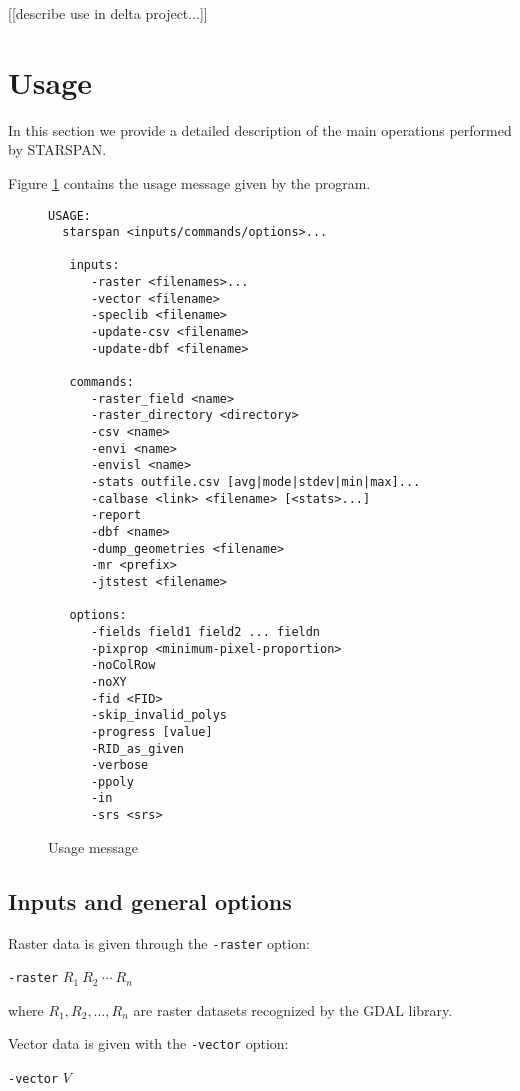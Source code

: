 \documentclass{elsart}
\begin{document}
	[[describe use in delta project...]]

\section{Usage}

In this section we provide a detailed description of the
main operations performed by STARSPAN.

Figure \ref{fig-usage} contains the usage message given by
the program.

\begin{figure}[!ht]
\centering
\scriptsize{
\begin{verbatim}
USAGE:
  starspan <inputs/commands/options>...

   inputs:
      -raster <filenames>...
      -vector <filename>
      -speclib <filename>
      -update-csv <filename>
      -update-dbf <filename>

   commands:
      -raster_field <name>
      -raster_directory <directory>
      -csv <name>
      -envi <name>
      -envisl <name>
      -stats outfile.csv [avg|mode|stdev|min|max]...
      -calbase <link> <filename> [<stats>...]
      -report
      -dbf <name>
      -dump_geometries <filename>
      -mr <prefix>
      -jtstest <filename>

   options:
      -fields field1 field2 ... fieldn
      -pixprop <minimum-pixel-proportion>
      -noColRow
      -noXY
      -fid <FID>
      -skip_invalid_polys
      -progress [value]
      -RID_as_given
      -verbose
      -ppoly
      -in
      -srs <srs>
\end{verbatim}
}
\label{fig-usage}
\caption{Usage message}
\end{figure}

\subsection{Inputs and general options}

Raster data is given through the \verb|-raster| option:

	\verb|-raster| $R_1\ R_2\ \cdots\ R_n$

where $R_1, R_2, \ldots, R_n$ are raster datasets recognized
by the GDAL library.

Vector data is given with the \verb|-vector| option:
	
	\verb|-vector| $V$
\end{document}
